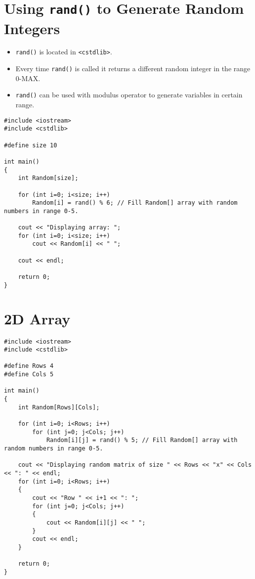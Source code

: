 \documentclass[12pt,a4paper]{article}
\begin{document}
\section{Using \texttt{rand()} to Generate Random Integers}
\begin{itemize}
\item \verb|rand()| is located in \verb|<cstdlib>|.
\item Every time \verb|rand()| is called it returns a different random integer in the range 0-MAX.
\item \verb|rand()| can be used with modulus operator to generate variables in certain range.
\end{itemize}
\begin{lstlisting}[caption={Using rand() to Fill an Array}]
#include <iostream>
#include <cstdlib>

#define size 10

int main()
{
	int Random[size];
	
	for (int i=0; i<size; i++)
		Random[i] = rand() % 6; // Fill Random[] array with random numbers in range 0-5.
		
	cout << "Displaying array: ";
	for (int i=0; i<size; i++)
		cout << Random[i] << " ";
		
	cout << endl;
	
	return 0;
}
\end{lstlisting}
\section{2D Array}
\begin{lstlisting}[caption={Using rand() to Fill a 2D Array}]
#include <iostream>
#include <cstdlib>

#define Rows 4
#define Cols 5

int main()
{
	int Random[Rows][Cols];
	
	for (int i=0; i<Rows; i++)
		for (int j=0; j<Cols; j++)
			Random[i][j] = rand() % 5; // Fill Random[] array with random numbers in range 0-5.
		
	cout << "Displaying random matrix of size " << Rows << "x" << Cols << ": " << endl;
	for (int i=0; i<Rows; i++)
	{
		cout << "Row " << i+1 << ": ";
		for (int j=0; j<Cols; j++)
		{
			cout << Random[i][j] << " ";
		}		
		cout << endl;
	}
		
	return 0;
}
\end{lstlisting}
\end{document}
